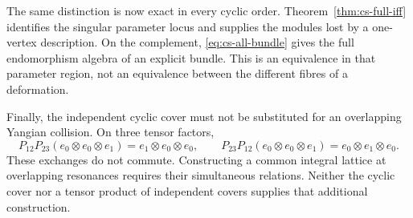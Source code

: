 The same distinction is now exact in every cyclic order.
Theorem~\ref{thm:cs-full-iff} identifies the singular parameter
locus and supplies the modules lost by a one-vertex description.
On the complement, \eqref{eq:cs-all-bundle} gives the full
endomorphism algebra of an explicit bundle. This is an equivalence
in that parameter region, not an equivalence between the different
fibres of a deformation.

Finally, the independent cyclic cover must not be substituted for
an overlapping Yangian collision. On three tensor factors,
\[
 P_{12}P_{23}(e_0\otimes e_0\otimes e_1)
   =e_1\otimes e_0\otimes e_0,\qquad
 P_{23}P_{12}(e_0\otimes e_0\otimes e_1)
   =e_0\otimes e_1\otimes e_0.
\]
These exchanges do not commute. Constructing a common integral
lattice at overlapping resonances requires their simultaneous
relations. Neither the cyclic cover nor a tensor product of
independent covers supplies that additional construction.
